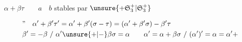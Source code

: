 $\alpha+\beta\tau\qquad a\quad b$ stables par $\unsure{+\mathfrak S_3^+|\mathfrak S_3^+}$

\[
 \begin{aligned}
 &\text{''}\quad\alpha'+\beta'\tau'=\alpha'+\beta'(\sigma-\tau)=(\alpha'+\beta'\sigma)-\beta'\tau\\
 &\beta'=-\beta\ /\ \alpha'\unsure{+|-}\beta\sigma=\alpha\qquad
 \alpha'=\alpha+\beta\sigma\ /\ (\alpha')'=\alpha=\alpha'+
 \end{aligned}
\]
